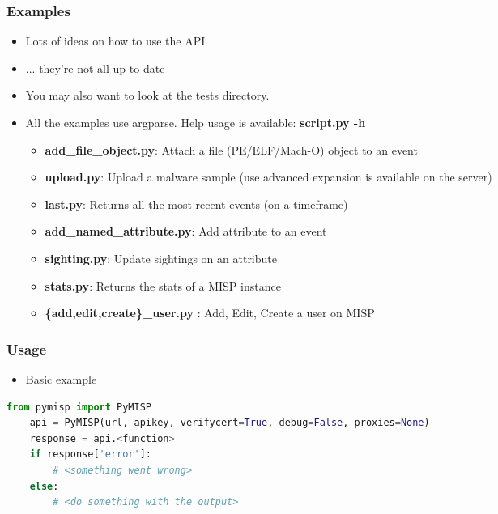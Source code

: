 \begin{frame}[fragile]
    \frametitle{Examples}
    \begin{itemize}
        \item Lots of ideas on how to use the API
        \item ... they're not all up-to-date
        \item You may also want to look at the tests directory.
        \item All the examples use argparse. Help usage is available: {\bf script.py -h}
        \begin{itemize}
            \item {\bf add\_file\_object.py}: Attach a file (PE/ELF/Mach-O) object to an event
            \item {\bf upload.py}: Upload a malware sample (use advanced expansion is available on the server)
            \item {\bf last.py}: Returns all the most recent events (on a timeframe)
            \item {\bf add\_named\_attribute.py}: Add attribute to an event
            \item {\bf sighting.py}: Update sightings on an attribute
            \item {\bf stats.py}: Returns the stats of a MISP instance
            \item {\bf \{add,edit,create\}\_user.py} : Add, Edit, Create a user on MISP
        \end{itemize}
    \end{itemize}
\end{frame}

\begin{frame}[fragile]
    \frametitle{Usage}
    \begin{itemize}
        \item Basic example
    \end{itemize}
        \begin{adjustbox}{width=\textwidth,height=2cm,keepaspectratio}
            \begin{lstlisting}[language=python,firstnumber=1]
    from pymisp import PyMISP
    api = PyMISP(url, apikey, verifycert=True, debug=False, proxies=None)
    response = api.<function>
    if response['error']:
        # <something went wrong>
    else:
        # <do something with the output>
            \end{lstlisting}
        \end{adjustbox}
\end{frame}


